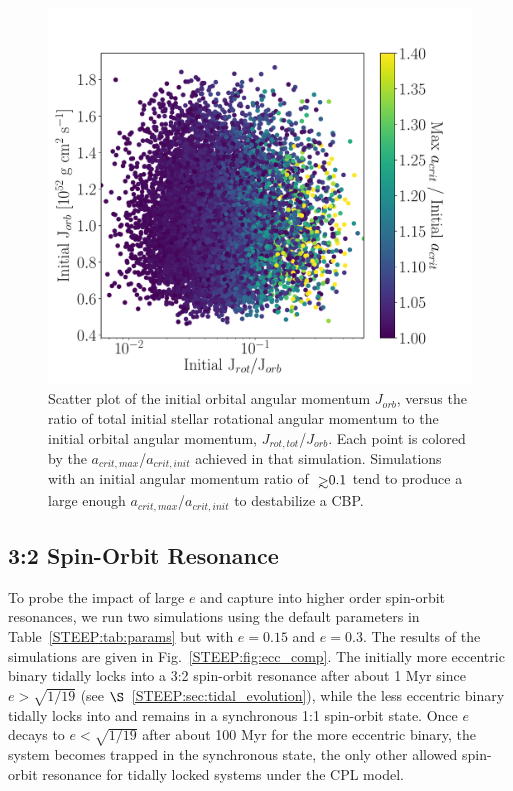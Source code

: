 \begin{figure}
	\includegraphics[width=\columnwidth]{mc_uniform.pdf}
    \caption{Scatter plot of the initial orbital angular momentum $J_{orb}$, versus the ratio of total initial stellar rotational angular momentum to the initial orbital angular momentum, $J_{rot,tot}$/$J_{orb}$.  Each point is colored by the $a_{crit,max}$/$a_{crit,init}$ achieved in that simulation.  Simulations with an initial angular momentum ratio of ${\gsim}0.1$ tend to produce a large enough $a_{crit,max}$/$a_{crit,init}$ to destabilize a CBP.}
    \label{STEEP:fig:mc_uniform}
\end{figure}

\subsection{3:2 Spin-Orbit Resonance} \label{STEEP:sec:32}

To probe the impact of large $e$ and capture into higher order spin-orbit resonances, we run two simulations using the default parameters in Table~\ref{STEEP:tab:params} but with $e = 0.15$ and $e = 0.3$.  The results of the simulations are given in Fig.~\ref{STEEP:fig:ecc_comp}.  The initially more eccentric binary tidally locks into a 3:2 spin-orbit resonance after about 1 Myr since $e > \sqrt{1/19}$ (see $\S$~\ref{STEEP:sec:tidal_evolution}), while the less eccentric binary tidally locks into and remains in a synchronous 1:1 spin-orbit state.  Once $e$ decays to $e < \sqrt{1/19}$ after about 100 Myr for the more eccentric binary, the system becomes trapped in the synchronous state, the only other allowed spin-orbit resonance for tidally locked systems under the CPL model.

